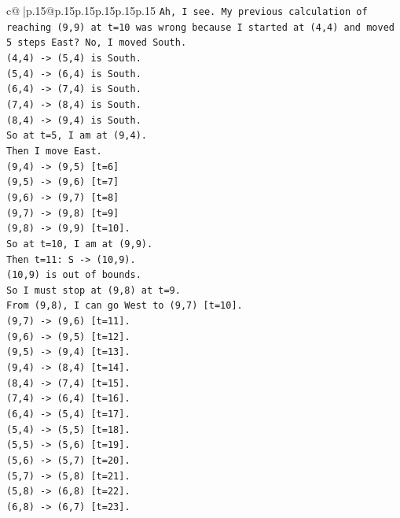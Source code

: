 \documentclass{article}
\begin{document}
{\begin{supertabular}{c@{$\;$}|p{.15\linewidth}@{}p{.15\linewidth}p{.15\linewidth}p{.15\linewidth}p{.15\linewidth}p{.15\linewidth}}
{{{\texttt{Ah, I see. My previous calculation of reaching (9,9) at t=10 was wrong because I started at (4,4) and moved 5 steps East? No, I moved South.} \\
\texttt{(4,4) {-}> (5,4) is South.} \\
\texttt{(5,4) {-}> (6,4) is South.} \\
\texttt{(6,4) {-}> (7,4) is South.} \\
\texttt{(7,4) {-}> (8,4) is South.} \\
\texttt{(8,4) {-}> (9,4) is South.} \\
\texttt{So at t=5, I am at (9,4).} \\
\texttt{Then I move East.} \\
\texttt{(9,4) {-}> (9,5) {[}t=6{]}} \\
\texttt{(9,5) {-}> (9,6) {[}t=7{]}} \\
\texttt{(9,6) {-}> (9,7) {[}t=8{]}} \\
\texttt{(9,7) {-}> (9,8) {[}t=9{]}} \\
\texttt{(9,8) {-}> (9,9) {[}t=10{]}.} \\
\texttt{So at t=10, I am at (9,9).} \\
\texttt{Then t=11: S {-}> (10,9).} \\
\texttt{(10,9) is out of bounds.} \\
\texttt{So I must stop at (9,8) at t=9.} \\
\texttt{From (9,8), I can go West to (9,7) {[}t=10{]}.} \\
\texttt{(9,7) {-}> (9,6) {[}t=11{]}.} \\
\texttt{(9,6) {-}> (9,5) {[}t=12{]}.} \\
\texttt{(9,5) {-}> (9,4) {[}t=13{]}.} \\
\texttt{(9,4) {-}> (8,4) {[}t=14{]}.} \\
\texttt{(8,4) {-}> (7,4) {[}t=15{]}.} \\
\texttt{(7,4) {-}> (6,4) {[}t=16{]}.} \\
\texttt{(6,4) {-}> (5,4) {[}t=17{]}.} \\
\texttt{(5,4) {-}> (5,5) {[}t=18{]}.} \\
\texttt{(5,5) {-}> (5,6) {[}t=19{]}.} \\
\texttt{(5,6) {-}> (5,7) {[}t=20{]}.} \\
\texttt{(5,7) {-}> (5,8) {[}t=21{]}.} \\
\texttt{(5,8) {-}> (6,8) {[}t=22{]}.} \\
\texttt{(6,8) {-}> (6,7) {[}t=23{]}.} \\
}}}
\end{supertabular}}
\end{document}

